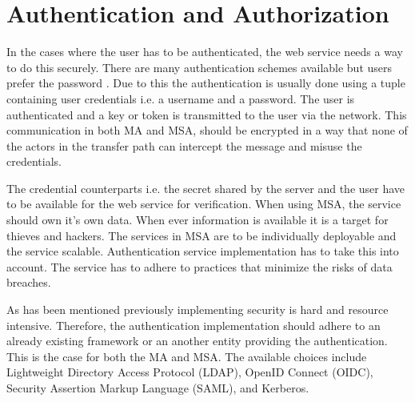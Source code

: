\section{Authentication and Authorization}
\begin{sloppypar}
    In the cases where the user has to be authenticated, the web service needs a
    way to do this securely. There are many authentication schemes available but
    users prefer the password \citep{passwordisdead}. Due to this the
    authentication is usually done using a tuple containing user credentials
    i.e. a username and a password. The user is authenticated and a key or token
    is transmitted to the user via the network. This communication in both MA
    and MSA, should be encrypted in a way that none of the actors in the
    transfer path can intercept the message and misuse the credentials. 
\end{sloppypar}
\begin{sloppypar}
    The credential counterparts i.e. the secret shared by the server and the
    user have to be available for the web service for verification. When using
    MSA, the service should own it's own data. When ever information is
    available it is a target for thieves and hackers. The services in MSA are to
    be individually deployable and the service scalable. Authentication service
    implementation has to take this into account. The service has to adhere to
    practices that minimize the risks of data breaches.
\end{sloppypar}
\begin{sloppypar}
    As has been mentioned previously implementing security is hard and resource
    intensive. Therefore, the authentication implementation should adhere to an
    already existing framework or an another entity providing the
    authentication. This is the case for both the MA and MSA. The available
    choices include Lightweight Directory Access Protocol (LDAP), OpenID Connect
    (OIDC), Security Assertion Markup Language (SAML), and Kerberos.
\end{sloppypar}

